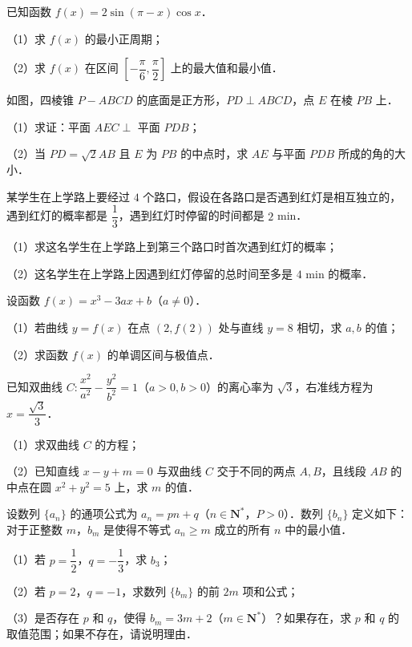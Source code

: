 \begin{question}
已知函数 $f(x)=2\sin(\pi-x)\cos x$．

（1）求 $f(x)$ 的最小正周期；

（2）求 $f(x)$ 在区间 $\left[-\dfrac{\pi}{6},\dfrac{\pi}{2}\right]$ 上的最大值和最小值．

\Needspace{0.4\textheight}
\end{question}
\begin{question}
如图，四棱锥 $P-ABCD$ 的底面是正方形，$PD\perp ABCD$，点 $E$ 在棱 $PB$ 上．
\nopagebreak[4]
\begin{center}\end{center}
\nopagebreak[4]
（1）求证：平面 $AEC\perp$ 平面 $PDB$；

（2）当 $PD=\sqrt2AB$ 且 $E$ 为 $PB$ 的中点时，求 $AE$ 与平面 $PDB$ 所成的角的大小．

\end{question}
\begin{question}
某学生在上学路上要经过 $4$ 个路口，假设在各路口是否遇到红灯是相互独立的，遇到红灯的概率都是 $\dfrac13$，遇到红灯时停留的时间都是 $2$ min．

（1）求这名学生在上学路上到第三个路口时首次遇到红灯的概率；

（2）这名学生在上学路上因遇到红灯停留的总时间至多是 $4$ min 的概率．

\end{question}
\begin{question}
设函数 $f(x)=x^3-3ax+b$（$a\neq0$）．

（1）若曲线 $y=f(x)$ 在点 $(2,f(2))$ 处与直线 $y=8$ 相切，求 $a,b$ 的值；

（2）求函数 $f(x)$ 的单调区间与极值点．

\end{question}
\begin{question}
已知双曲线 $C:\dfrac{x^2}{a^2}-\dfrac{y^2}{b^2}=1$（$a>0,b>0$）的离心率为 $\sqrt3$，右准线方程为 $x=\dfrac{\sqrt3}{3}$．

（1）求双曲线 $C$ 的方程；

（2）已知直线 $x-y+m=0$ 与双曲线 $C$ 交于不同的两点 $A,B$，且线段 $AB$ 的中点在圆 $x^2+y^2=5$ 上，求 $m$ 的值．

\end{question}
\begin{question}
设数列 $\{a_n\}$ 的通项公式为 $a_n=pn+q$（$n\in\mathbf N^*$，$P>0$）．数列 $\{b_n\}$ 定义如下：对于正整数 $m$，$b_m$ 是使得不等式 $a_n\geqslant m$ 成立的所有 $n$ 中的最小值．

（1）若 $p=\dfrac12$，$q=-\dfrac13$，求 $b_3$；

（2）若 $p=2$，$q=-1$，求数列 $\{b_m\}$ 的前 $2m$ 项和公式；

（3）是否存在 $p$ 和 $q$，使得 $b_m=3m+2$（$m\in\mathbf N^*$）？如果存在，求 $p$ 和 $q$ 的取值范围；如果不存在，请说明理由．

\end{question}